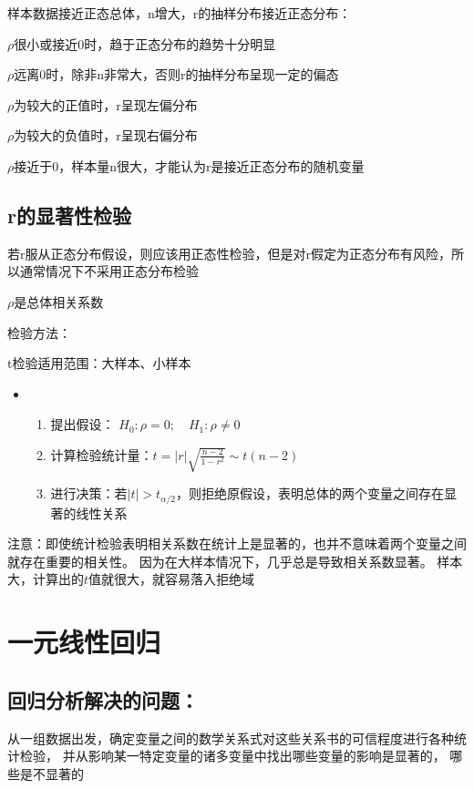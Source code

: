 \documentclass[UTF8,10pt]{book}
\begin{document}
    样本数据接近正态总体，n增大，r的抽样分布接近正态分布：

    $\rho$很小或接近0时，趋于正态分布的趋势十分明显

    $\rho$远离0时，除非n非常大，否则r的抽样分布呈现一定的偏态 

    $\rho$为较大的正值时，r呈现左偏分布 

    $\rho$为较大的负值时，r呈现右偏分布 

    $\rho$接近于0，样本量n很大，才能认为r是接近正态分布的随机变量

\subsection{r的显著性检验}	
若r服从正态分布假设，则应该用正态性检验，但是对r假定为正态分布有风险，所以通常情况下不采用正态分布检验 

$\rho$是总体相关系数 

检验方法：

t检验适用范围：大样本、小样本

\begin{itemize}
	\item [] {
		\begin{enumerate}
			\item 提出假设： $H_0:\rho=0; \quad H_1:\rho\neq 0$
			\item 计算检验统计量：$ t = |r| \sqrt{ \frac{n-2}{1-r^2} } \sim t(n-2) $
			\item 进行决策：若$|t|>t_{\alpha / 2}$，则拒绝原假设，表明总体的两个变量之间存在显著的线性关系 
			
		\end{enumerate}
	}
\end{itemize}

注意：即使统计检验表明相关系数在统计上是显著的，也并不意味着两个变量之间就存在重要的相关性。
因为在大样本情况下，几乎总是导致相关系数显著。 样本大，计算出的$t$值就很大，就容易落入拒绝域

\section{一元线性回归}
\subsection{回归分析解决的问题：}	
从一组数据出发，确定变量之间的数学关系式对这些关系书的可信程度进行各种统计检验，
并从影响某一特定变量的诸多变量中找出哪些变量的影响是显著的，
哪些是不显著的
\end{document}
